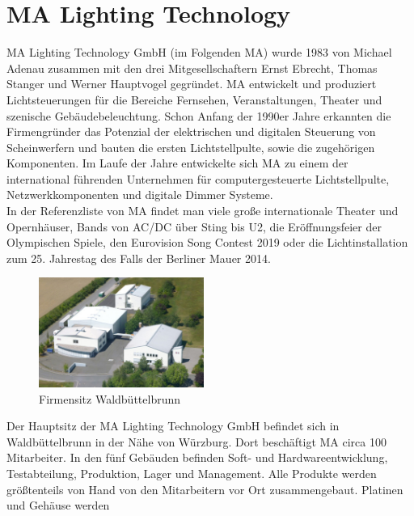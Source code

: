 \documentclass[11pt]{scrartcl}
\begin{document}
\section{MA Lighting Technology}
MA Lighting Technology GmbH (im Folgenden MA) wurde 1983 von Michael Adenau zusammen mit
den drei Mitgesellschaftern Ernst Ebrecht, Thomas Stanger und Werner Hauptvogel gegründet. MA
entwickelt und produziert Lichtsteuerungen für die Bereiche Fernsehen, Veranstaltungen, Theater
und szenische Gebäudebeleuchtung. Schon Anfang der 1990er Jahre erkannten die Firmengründer
das Potenzial der elektrischen und digitalen Steuerung von Scheinwerfern und bauten die ersten
Lichtstellpulte, sowie die zugehörigen Komponenten. Im Laufe der Jahre entwickelte sich MA zu
einem der international führenden Unternehmen für computergesteuerte Lichtstellpulte,
Netzwerkkomponenten und digitale Dimmer Systeme.\\
In der Referenzliste von MA findet man viele große internationale Theater und Opernhäuser, Bands
von AC/DC über Sting bis U2, die Eröffnungsfeier der Olympischen Spiele, den Eurovision Song
Contest 2019 oder die Lichtinstallation zum 25. Jahrestag des Falls der Berliner Mauer 2014.\\
\begin{figure}
    \vspace{-25pt}
    \begin{center}
        \includegraphics[width=0.48\textwidth]{images/csm_MA_building_WBB.jpg}
    \end{center}
    \vspace{-20pt}
    \caption{Firmensitz Waldbüttelbrunn \cite{maabout}}
    \vspace{-15pt}
\end{figure}
Der Hauptsitz der MA Lighting Technology GmbH befindet sich in Waldbüttelbrunn in der Nähe von
Würzburg. Dort beschäftigt MA circa 100 Mitarbeiter. In den fünf Gebäuden befinden Soft- und
Hardwareentwicklung, Testabteilung, Produktion, Lager und Management. Alle Produkte werden
größtenteils von Hand von den Mitarbeitern vor Ort zusammengebaut. Platinen und Gehäuse werden
\end{document}
